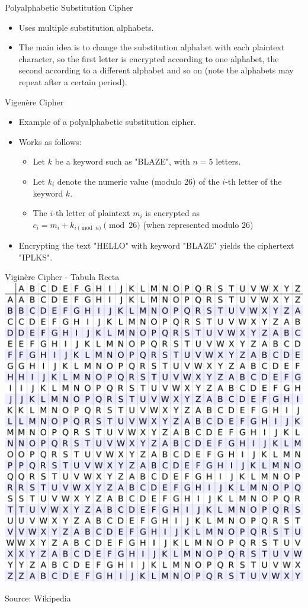 \documentclass[presentation]{beamer}
\begin{document}
\begin{frame}[label=sec-12]{Polyalphabetic Substitution Cipher}
\begin{itemize}[<+->]
\item Uses multiple substitution alphabets.
\item The main idea is to change the substitution alphabet with each plaintext character, so the first letter is encrypted according to one alphabet, the second according to a different alphabet and so on (note the alphabets may repeat after a certain period).
\end{itemize}
\end{frame}
\begin{frame}[label=sec-13]{Vigenère Cipher}
\begin{itemize}[<+->]
\item Example of a polyalphabetic substitution cipher.
\item Works as follows:
\begin{itemize}
\item Let $k$ be a keyword such as "BLAZE", with $n = 5$ letters.
\item Let $k_i$ denote the numeric value (modulo 26) of the $i$-th letter of the keyword $k$.
\item The $i$-th letter of plaintext $m_i$ is encrypted as $c_i = m_i + k_{i \pmod{n}} \pmod{26}$ (when represented modulo $26$)
\end{itemize}
\item Encrypting the text "HELLO" with keyword "BLAZE" yields the ciphertext "IPLKS".
\end{itemize}
\end{frame}
\begin{frame}[label=sec-14]{Viginère Cipher - Tabula Recta}
\includegraphics[scale=0.45]{tabula_recta.png}


Source: Wikipedia
\end{frame}
\end{document}
